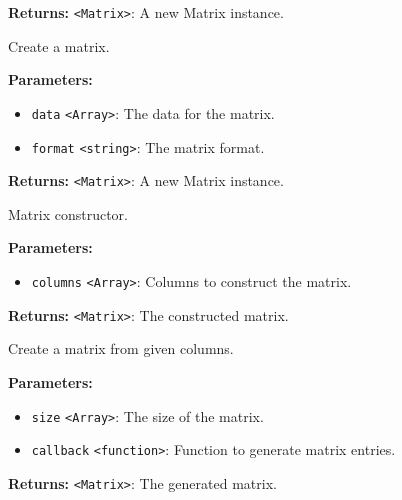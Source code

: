 \documentclass[12pt,a4paper]{article}
\begin{document}
\noindent \textbf{Returns:} \texttt{<Matrix>}: A new Matrix instance.

\noindent Create a matrix.

\vspace{5mm}
\noindent {}


\noindent \textbf{Parameters:}
\begin{itemize}
  \item \texttt{data} \texttt{<Array>}: The data for the matrix.
  \item \texttt{format} \texttt{<string>}: The matrix format.
\end{itemize}

\noindent \textbf{Returns:} \texttt{<Matrix>}: A new Matrix instance.

\noindent Matrix constructor.

\vspace{5mm}
\noindent {}


\noindent \textbf{Parameters:}
\begin{itemize}
  \item \texttt{columns} \texttt{<Array>}: Columns to construct the matrix.
\end{itemize}

\noindent \textbf{Returns:} \texttt{<Matrix>}: The constructed matrix.

\noindent Create a matrix from given columns.

\vspace{5mm}
\noindent {}


\noindent \textbf{Parameters:}
\begin{itemize}
  \item \texttt{size} \texttt{<Array>}: The size of the matrix.
  \item \texttt{callback} \texttt{<function>}: Function to generate matrix entries.
\end{itemize}

\noindent \textbf{Returns:} \texttt{<Matrix>}: The generated matrix.
\end{document}
